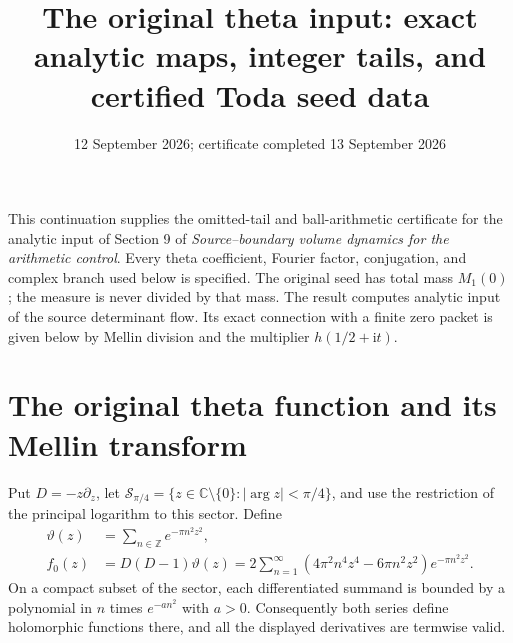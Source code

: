 \documentclass[11pt]{article}
\title{The original theta input: exact analytic maps, integer tails, and certified Toda seed data}
\author{}
\date{12 September 2026; certificate completed 13 September 2026}
\newcommand{\ii}{\mathrm i}
\begin{document}
\maketitle

This continuation supplies the omitted-tail and ball-arithmetic certificate
for the analytic input of Section 9 of \emph{Source--boundary volume
dynamics for the arithmetic control}. Every theta coefficient, Fourier
factor, conjugation, and complex branch used below is specified. The
original seed has total mass $M_1(0)$; the measure is never divided by
that mass. The result computes analytic input of the source determinant
flow. Its exact connection with a finite zero packet is given below by
Mellin division and the multiplier $h(1/2+\ii t)$.

\section{The original theta function and its Mellin transform}

Put $D=-z\partial_z$, let
$\mathcal S_{\pi/4}=\{z\in\mathbb C\setminus\{0\}:|\arg z|<\pi/4\}$,
and use the restriction of the principal logarithm to this sector. Define
\begin{align}
 \vartheta(z)&=\sum_{n\in\mathbb Z}e^{-\pi n^2z^2},\tag{TI.1}\\
 f_0(z)&=D(D-1)\vartheta(z)
 =2\sum_{n=1}^\infty(4\pi^2n^4z^4-6\pi n^2z^2)e^{-\pi n^2z^2}.
 \tag{TI.2}
\end{align}
On a compact subset of the sector, each differentiated summand is
bounded by a polynomial in $n$ times $e^{-a n^2}$ with $a>0$.
Consequently both series define holomorphic functions there, and all
the displayed derivatives are termwise valid.
\end{document}
